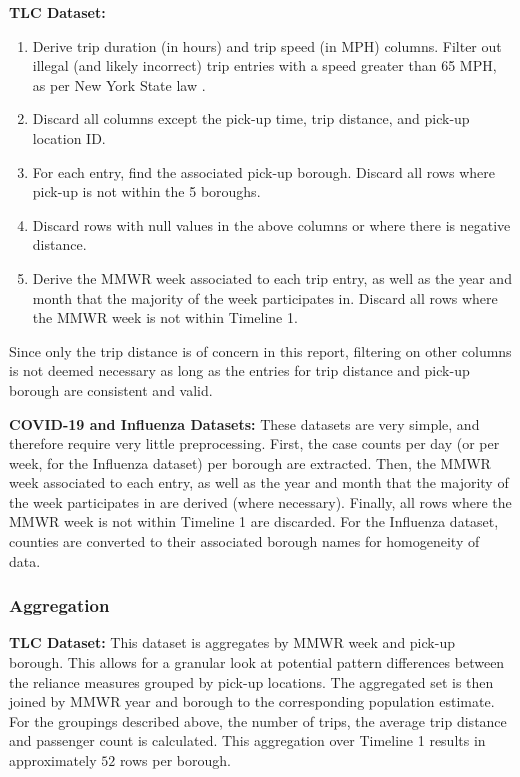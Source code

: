 \documentclass[11pt]{article}
\begin{document}
\textbf{TLC Dataset:}
    \begin{enumerate}
        \item Derive trip duration (in hours) and trip speed (in MPH) columns. 
        Filter out illegal (and likely incorrect) trip entries with a speed greater than 65 MPH, 
        as per New York State law \cite{laws}.
        \item Discard all columns except the pick-up time, trip distance, and pick-up location ID.
        \item For each entry, find the associated pick-up borough. 
        Discard all rows where pick-up is not within the 5 boroughs.
        \item Discard rows with null values in the above columns or where there is negative distance.
        \item Derive the MMWR week associated to each trip entry, as well as the year and month that the majority of the week participates in.
        Discard all rows where the MMWR week is not within Timeline 1.
    \end{enumerate}
Since only the trip distance is of concern in this report,
filtering on other columns is not deemed necessary as long as the entries for trip distance and pick-up borough are consistent and valid.

\textbf{COVID-19 and Influenza Datasets:}
These datasets are very simple, and therefore require very little preprocessing.
First, the case counts per day (or per week, for the Influenza dataset) per borough are extracted. 
Then, the MMWR week associated to each entry, as well as the year and month that the majority of the week participates in are derived (where necessary).
Finally, all rows where the MMWR week is not within Timeline 1 are discarded.
For the Influenza dataset, 
counties are converted to their associated borough names for homogeneity of data.

\subsubsection{Aggregation}

\textbf{TLC Dataset:}
This dataset is aggregates by MMWR week and pick-up borough.
This allows for a granular look at potential pattern differences between the reliance measures grouped by pick-up locations.
The aggregated set is then joined by MMWR year and borough to the corresponding population estimate.
For the groupings described above, the number of trips,
the average trip distance and passenger count is calculated.
This aggregation over Timeline 1 results in approximately $52$ rows per borough.
\end{document}
